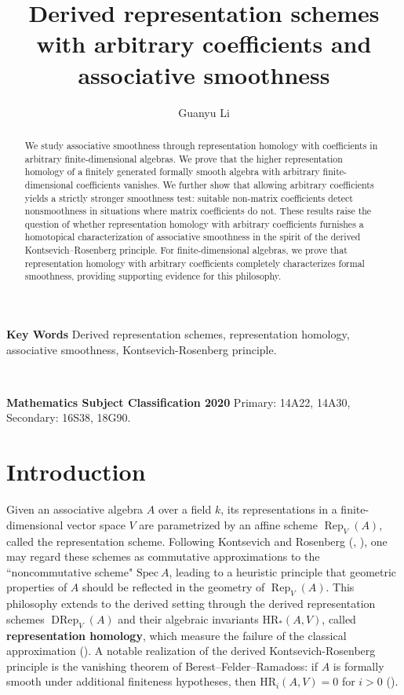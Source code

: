 \documentclass{article}
\title{Derived representation schemes with arbitrary coefficients and associative smoothness}
\author{Guanyu Li}
\numberwithin{equation}{section} %
\theoremstyle{plain}
\theoremstyle{definition}
\theoremstyle{remark}
\providecommand{\keywords}[1]
{
  \small	
  \textbf{Key Words } #1
  \normalsize
}
\providecommand{\class}[1]
{
  \small	
  \textbf{Mathematics Subject Classification 2020 } #1
  \normalsize
}
\begin{document}
\maketitle


\begin{abstract}
We study associative smoothness through representation homology with coefficients in arbitrary finite-dimensional algebras.
We prove that the higher representation homology of a finitely generated formally smooth algebra with arbitrary finite-dimensional coefficients vanishes.
We further show that allowing arbitrary coefficients yields a strictly stronger smoothness test: suitable non-matrix coefficients detect nonsmoothness in situations where matrix coefficients do not.
These results raise the question of whether representation homology with arbitrary coefficients furnishes a homotopical characterization of associative smoothness in the spirit of the derived Kontsevich–Rosenberg principle.
For finite-dimensional algebras, we prove that representation homology with arbitrary coefficients completely characterizes formal smoothness, providing supporting evidence for this philosophy.
\end{abstract}

\keywords{Derived representation schemes, representation homology, associative smoothness, Kontsevich-Rosenberg principle.}
~\par

\class{Primary: 14A22, 14A30, Secondary: 16S38, 18G90.}

\section{Introduction}

Given an associative algebra $A$ over a field $k$, its representations in a finite-dimensional vector space $V$ are parametrized by an affine scheme $\operatorname{Rep}_V(A)$, called the representation scheme.
Following Kontsevich and Rosenberg (\cite[Section 9]{K93}, \cite{KR00}), one may regard these schemes as commutative approximations to the ``noncommutative scheme" $\mathrm{Spec}~A$, leading to a heuristic principle that geometric properties of $A$ should be reflected in the geometry of $\operatorname{Rep}_V(A)$.
This philosophy extends to the derived setting through the derived representation schemes $\operatorname{DRep}_V(A)$ and their algebraic invariants $\mathrm{HR}_*(A,V)$, called \textbf{representation homology}, which measure the failure of the classical approximation (\cite{BFR14,BKR13}).
A notable realization of the derived Kontsevich-Rosenberg principle is the vanishing theorem of Berest–Felder–Ramadoss: if $A$ is formally smooth under additional finiteness hypotheses, then $\mathrm{HR}_i(A,V)=0$ for $i>0$ (\cite[Theorem 20]{BFR14}).
\end{document}
